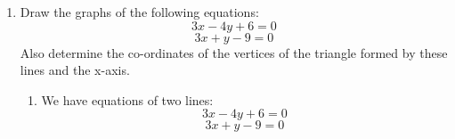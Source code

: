 \documentclass[journal,12pt,twocolumn]{IEEEtran}
\renewcommand\thesection{\arabic{section}}
\begin{document}
\begin{enumerate}[label=\thesection.\arabic*.,ref=\thesection.\theenumi]
\item Draw the graphs of the following equations: 
\[ 3x-4y+6=0 \]
\[ 3x+y-9=0 \]
Also determine the co-ordinates of the vertices of the triangle formed by these lines and the x-axis.\\
\solution\begin{enumerate}
    \item We have equations of two lines:
\begin{equation}\label{eq:1}
    3x-4y+6=0
    \end{equation}
    \begin{equation}\label{eq:2}
        3x+y-9=0 
    \end{equation}


\end{enumerate}
\end{enumerate}
\end{document}
